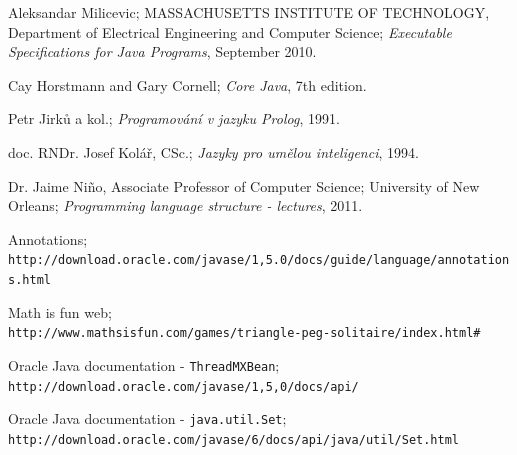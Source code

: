 \documentclass[11pt,twoside,a4paper]{book}
\begin{document}
\begin{thebibliography}{1}

Aleksandar Milicevic; MASSACHUSETTS INSTITUTE OF TECHNOLOGY, Department of
Electrical Engineering and Computer Science; \textit{Executable Specifications
for Java Programs}, September 2010.

Cay Horstmann and Gary Cornell; \textit{Core Java}, 7th edition.

Petr Jirků a kol.; \textit{Programování v jazyku Prolog}, 1991.

doc. RNDr. Josef Kolář, CSc.; \textit{Jazyky pro umělou inteligenci}, 1994.

Dr. Jaime Niño, Associate Professor of Computer Science; University of New
Orleans; \textit{Programming language structure - lectures}, 2011.

Annotations;\\
\verb|http://download.oracle.com/javase/1,5.0/docs/guide/language/annotations.html|

Math
is fun
web;\\\verb|http://www.mathsisfun.com/games/triangle-peg-solitaire/index.html#|

Oracle Java documentation - \verb|ThreadMXBean|;\\
\verb|http://download.oracle.com/javase/1,5,0/docs/api/|

Oracle Java documentation - \verb|java.util.Set|;\\
\verb|http://download.oracle.com/javase/6/docs/api/java/util/Set.html|

\end{thebibliography}

%




%
{
\def\CS{$\cal C\kern-0.1667em\lower.5ex\hbox{$\cal S$}\kern-0.075em $}

}
\end{document}
